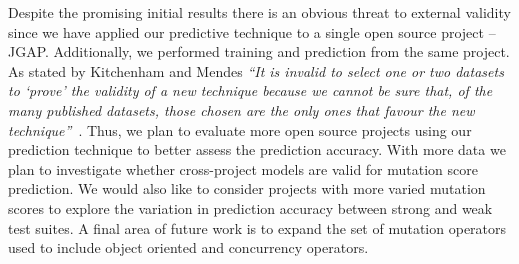 \documentclass[10pt,conference,compsocconf]{IEEEtran}
\begin{document}
Despite the promising initial results there is an obvious threat to external validity since we have applied our predictive technique to a single open source project -- JGAP. Additionally, we performed training and prediction from the same project. As stated by Kitchenham and Mendes \textit{``It is invalid to select one or two datasets to `prove' the validity of a new technique because we cannot be sure that, of the many published datasets, those chosen are the only ones that favour the new technique''}~\cite{KM09}. Thus, we plan to evaluate more open source projects using our prediction technique to better assess the prediction accuracy. With more data we plan to investigate whether cross-project models are valid for mutation score prediction. We would also like to consider projects with more varied mutation scores to explore the variation in prediction accuracy between strong and weak test suites. A final area of future work is to expand the set of mutation operators used to include object oriented and concurrency operators.


\balance




\end{document}
